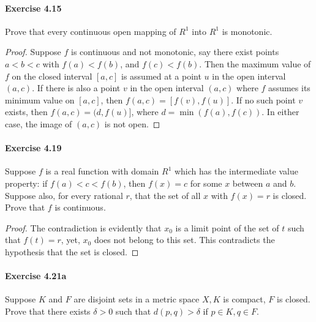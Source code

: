 \documentclass{article}
\theoremstyle{definition}
\begin{document}
\paragraph{Exercise 4.15} Prove that every continuous open mapping of $R^{1}$ into $R^{1}$ is monotonic.
\begin{proof}
    Suppose $f$ is continuous and not monotonic, say there exist points $a<b<c$ with $f(a)<f(b)$, and $f(c)<f(b)$. Then the maximum value of $f$ on the closed interval $[a, c]$ is assumed at a point $u$ in the open interval $(a, c)$. If there is also a point $v$ in the open interval $(a, c)$ where $f$ assumes its minimum value on $[a, c]$, then $f(a, c)=[f(v), f(u)]$. If no such point $v$ exists, then $f(a, c)=(d, f(u)]$, where $d=\min (f(a), f(c))$. In either case, the image of $(a, c)$ is not open.
\end{proof}



\paragraph{Exercise 4.19} Suppose $f$ is a real function with domain $R^{1}$ which has the intermediate value property: if $f(a)<c<f(b)$, then $f(x)=c$ for some $x$ between $a$ and $b$. Suppose also, for every rational $r$, that the set of all $x$ with $f(x)=r$ is closed. Prove that $f$ is continuous.
\begin{proof}
    The contradiction is evidently that $x_0$ is a limit point of the set of $t$ such that $f(t)=r$, yet, $x_0$ does not belong to this set. This contradicts the hypothesis that the set is closed.
\end{proof}



\paragraph{Exercise 4.21a} Suppose $K$ and $F$ are disjoint sets in a metric space $X, K$ is compact, $F$ is closed. Prove that there exists $\delta>0$ such that $d(p, q)>\delta$ if $p \in K, q \in F$.
\end{document}
